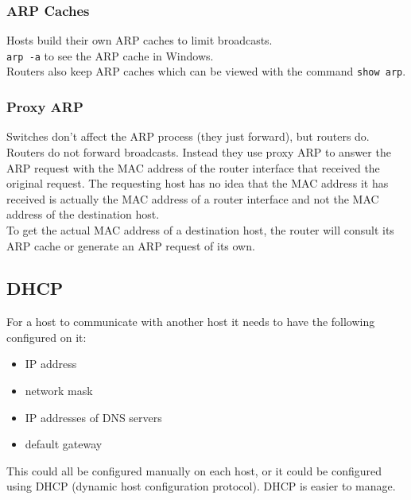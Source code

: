 \subsubsection{ARP Caches}

Hosts build their own ARP caches to limit broadcasts.\\

\texttt{arp -a} to see the ARP cache in Windows.\\

Routers also keep ARP caches which can be viewed with the command
\texttt{show arp}.

\subsubsection{Proxy ARP}

Switches don't affect the ARP process (they just forward), but routers do.\\

Routers do not forward broadcasts. Instead they use proxy ARP to answer the
ARP request with the MAC address of the router interface that received the
original request. The requesting host has no idea that the MAC address it
has received is actually the MAC address of a router interface and not the
MAC address of the destination host.\\

To get the actual MAC address of a destination host, the router will consult
its ARP cache or generate an ARP request of its own.

\subsection{DHCP}

For a host to communicate with another host it needs to have the following
configured on it:

\begin{itemize}

\item IP address
\item network mask
\item IP addresses of DNS servers
\item default gateway

\end{itemize}

This could all be configured manually on each host, or it could be configured
using DHCP (dynamic host configuration protocol). DHCP is easier to manage.

